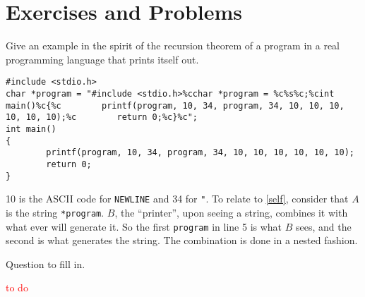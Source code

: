 \section*{Exercises and Problems}

\begin{exercise}{6.1}
  Give an example in the spirit of the recursion theorem of a program in a real programming language that prints itself out.
\end{exercise}

\begin{lstlisting}[caption=A piece of C that prints itself.]
#include <stdio.h>
char *program = "#include <stdio.h>%cchar *program = %c%s%c;%cint main()%c{%c        printf(program, 10, 34, program, 34, 10, 10, 10, 10, 10, 10);%c        return 0;%c}%c";
int main()
{
        printf(program, 10, 34, program, 34, 10, 10, 10, 10, 10, 10);
        return 0;
}
\end{lstlisting}

10 is the ASCII code for \texttt{NEWLINE} and 34 for \texttt{"}. To relate to \ref{self}, consider that $A$ is the string \texttt{*program}. $B$, the ``printer'', upon seeing a string, combines it with what ever will generate it. So the first \texttt{program} in line 5 is what $B$ sees, and the second is what generates the string. The combination is done in a nested fashion.

\setcounter{exercise}{10}

\begin{exercise}{6.11}
  Question to fill in.
\end{exercise}

\textcolor{red}{to do}
